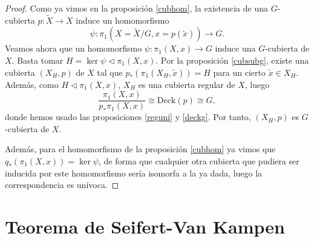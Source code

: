 \documentclass[12pt,a4paper]{book}
\theoremstyle{definition} \newtheorem{defn}[thm]{Definición}
\theoremstyle{definition} \newtheorem{ejemplo}[thm]{Ejemplo}
\theoremstyle{definition} \newtheorem{ejercicio}[thm]{Ejercicio}
\theoremstyle{remark} \newtheorem*{obs}{Observación}
\def\gf{\pi_1}
\def\XX{\tilde{X}}
\def\xx{\tilde{x}}
\def\DD{\mathrm{Deck}}
\begin{document}
\begin{proof}
  Como ya vimos en la proposición \ref{cubhom}, la existencia de una $G$-cubierta $p:\XX\rightarrow X$ induce un homomorfismo 
  \begin{equation*}
    \psi:\gf(X=\XX/G,x=p(\xx))\rightarrow G.
  \end{equation*}
  Veamos ahora que un homomorfismo $\psi:\gf(X,x)\rightarrow G$ induce una $G$-cubierta de $X$. Basta tomar $H=\ker\psi \lhd \gf(X,x)$. Por la proposición \ref{cubsubg}, existe una cubierta $(X_H,p)$ de $X$ tal que $p_*(\gf(X_H,\xx))=H$ para un cierto $\xx \in X_H$. Además, como $H\lhd \gf(X,x)$, $X_H$ es una cubierta regular de $X$, luego
  \begin{equation*}
    \frac{\gf(X,x)}{p_*\gf(X,x)}\cong \DD(p) \cong G,
  \end{equation*}
  donde hemos usado las proposiciones \ref{reguni} y \ref{deckg}. Por tanto, $(X_H,p)$ es $G$-cubierta de $X$.

  Además, para el homomorfismo de la proposición \ref{cubhom} ya vimos que $q_*(\gf(X,x))=\ker \psi$, de forma que cualquier otra cubierta que pudiera ser inducida por este homomorfismo sería isomorfa a la ya dada, luego la correspondencia es unívoca.
\end{proof}

\chapter{Teorema de Seifert-Van Kampen}
\end{document}
